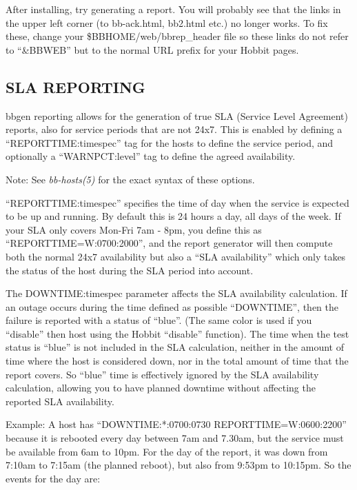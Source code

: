   After installing, try generating a report. You will probably see
  that the links in the upper left corner (to bb-ack.html, bb2.html
  etc.) no longer works. To fix these, change your
  \$BBHOME/web/bbrep\_header file so these links do not refer to
  ``\&BBWEB'' but to the normal URL prefix for your Hobbit pages. 



 
\subsection{SLA REPORTING}
 bbgen reporting allows for the generation of true SLA (Service Level
 Agreement) reports, also for service periods that are not 24x7. This
 is enabled by defining a ``REPORTTIME:timespec'' tag for the hosts to
 define the service period, and optionally a ``WARNPCT:level'' tag to
 define the agreed availability. 


  Note: See \emph{bb-hosts(5)}
 for the exact syntax of these options. 


  ``REPORTTIME:timespec'' specifies the time of day when the service
  is expected to be up and running. By default this is 24 hours a day,
  all days of the week. If your SLA only covers Mon-Fri 7am - 8pm, you
  define this as ``REPORTTIME=W:0700:2000'', and the report generator
  will then compute both the normal 24x7 availability but also a ``SLA
  availability'' which only takes the status of the host during the
  SLA period into account. 



  The DOWNTIME:timespec parameter affects the SLA availability
  calculation. If an outage occurs during the time defined as possible
  ``DOWNTIME'', then the failure is reported with a status of
  ``blue''. (The same color is used if you ``disable'' then host using
  the Hobbit ``disable'' function). The time when the test status is
  ``blue'' is not included in the SLA calculation, neither in the
  amount of time where the host is considered down, nor in the total
  amount of time that the report covers. So ``blue'' time is
  effectively ignored by the SLA availability calculation, allowing
  you to have planned downtime without affecting the reported SLA
  availability. 



  Example: A host has ``DOWNTIME:*:0700:0730 REPORTTIME=W:0600:2200''
  because it is rebooted every day between 7am and 7.30am, but the
  service must be available from 6am to 10pm. For the day of the
  report, it was down from 7:10am to 7:15am (the planned reboot), but
  also from 9:53pm to 10:15pm. So the events for the day are: 



